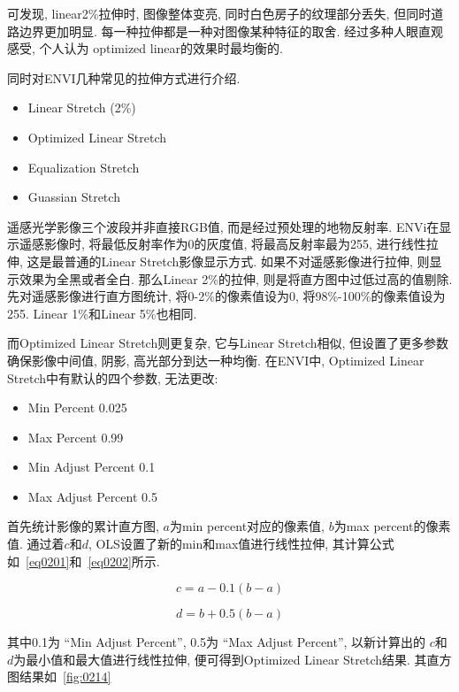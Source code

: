 可发现, linear2\%拉伸时, 图像整体变亮, 同时白色房子的纹理部分丢失, 但同时道路边界更加明显. 每一种拉伸都是一种对图像某种特征的取舍. 经过多种人眼直观感受, 个人认为 optimized linear的效果时最均衡的. 

同时对ENVI几种常见的拉伸方式进行介绍.

\begin{itemize}
    \item Linear Stretch (2\%)
    \item Optimized Linear Stretch
    \item Equalization Stretch 
    \item Guassian Stretch
\end{itemize}

遥感光学影像三个波段并非直接RGB值, 而是经过预处理的地物反射率. ENVi在显示遥感影像时, 将最低反射率作为0的灰度值, 将最高反射率最为255, 进行线性拉伸, 这是最普通的Linear Stretch影像显示方式. 如果不对遥感影像进行拉伸, 则显示效果为全黑或者全白. 那么Linear 2\%的拉伸, 则是将直方图中过低过高的值剔除. 先对遥感影像进行直方图统计, 将0-2\%的像素值设为0, 将98\%-100\%的像素值设为255. Linear 1\%和Linear 5\%也相同. 

而Optimized Linear Stretch则更复杂, 它与Linear Stretch相似, 但设置了更多参数确保影像中间值, 阴影, 高光部分到达一种均衡. 在ENVI中, Optimized Linear Stretch中有默认的四个参数, 无法更改:
\begin{itemize}
    \item Min Percent 0.025
    \item Max Percent 0.99
    \item Min Adjust Percent 0.1
    \item Max Adjust Percent 0.5
\end{itemize}


首先统计影像的累计直方图, $a$为min percent对应的像素值, $b$为max percent的像素值. 通过着$c$和$d$, OLS设置了新的min和max值进行线性拉伸, 其计算公式如~\ref{eq0201}和~\ref{eq0202}所示. 

\begin{equation}
    c = a - 0.1(b - a)
    \label{eq0201}
\end{equation}

\begin{equation}
    d = b + 0.5(b - a)
    \label{eq0202}
\end{equation}

其中0.1为 ``Min Adjust Percent'', 0.5为 ``Max Adjust Percent'', 以新计算出的 $c$和$d$为最小值和最大值进行线性拉伸, 便可得到Optimized Linear Stretch结果. 其直方图结果如~\ref{fig:0214}


